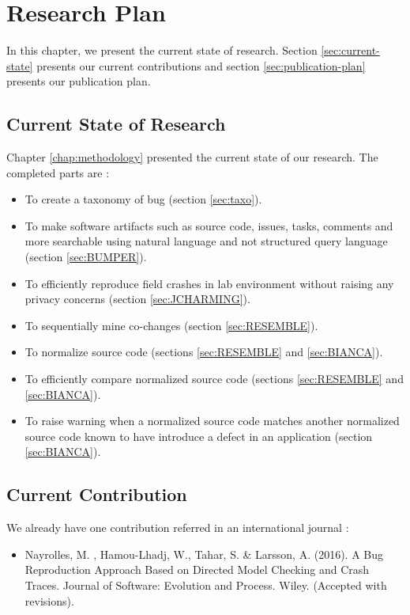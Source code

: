 
\chapter{Research Plan\label{chap:plan}}

In this chapter, we present the current state of research. Section \ref{sec:current-state} presents our current contributions and section \ref{sec:publication-plan} presents our publication plan.

\section{Current State of Research\label{sec:current-state}}

Chapter \ref{chap:methodology} presented the current state of our research. The completed parts are :

\begin{itemize}
	\item To create a taxonomy of bug (section \ref{sec:taxo}).
	\item To make software artifacts such as source code, issues, tasks, comments and more searchable using natural language and not structured query language (section \ref{sec:BUMPER}).
	\item To efficiently reproduce field crashes in lab environment without raising any privacy concerns (section \ref{sec:JCHARMING}).
	\item To sequentially mine co-changes (section \ref{sec:RESEMBLE}).
	\item To normalize source code (sections \ref{sec:RESEMBLE} and \ref{sec:BIANCA}).
	\item To efficiently compare normalized source code (sections \ref{sec:RESEMBLE} and \ref{sec:BIANCA}).
	\item To raise warning when a normalized source code matches another normalized source code known to have introduce a defect in an application (section \ref{sec:BIANCA}).
\end{itemize}

\section{Current Contribution\label{sec:current-state}}

We already have one contribution referred in an international journal \cite{Nayrolles2016a}:

\begin{itemize}
	\item Nayrolles, M. , Hamou-Lhadj, W., Tahar, S. & Larsson, A. (2016). A Bug Reproduction Approach Based on Directed Model Checking and Crash Traces. Journal of Software: Evolution and Process. Wiley. (Accepted with revisions).
\end{itemize}

